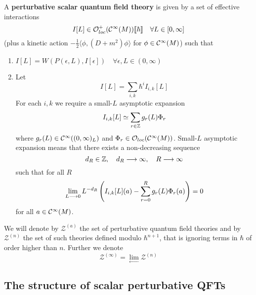 \begin{definition}
\label{def:PSQFTs}
  A \textbf{perturbative scalar quantum field theory} is given by a set of effective interactions
  \begin{equation}I[L] \in \mathcal{O}^+_{loc}(\mathcal{C}^{\infty}(M))\llbracket \hbar \rrbracket \quad \forall L \in [0, \infty]\end{equation}
  (plus a kinetic action $- \frac{1}{2} \langle \phi, (D + m^2) \phi \rangle$ for $\phi \in \Ci(M)$) such that
  \begin{enumerate}
    \item $I[L] = W(P(\epsilon, L), I[\epsilon]) \quad \forall \epsilon,L \in (0,\infty)$

    \item Let
    \begin{equation}I[L] = \sum_{i,k} \hbar^i I_{i,k}[L]\end{equation}
    For each $i,k$ we require a small-$L$ asymptotic expansion
    \begin{equation}I_{i,k}[L] \simeq \sum_{r \in \mathbb{Z}} g_r(L) \Phi_r\end{equation}
    where $g_r(L) \in \mathcal{C}^{\infty}((0,\infty)_L)$ and $\Phi_r \in \mathcal{O}_{loc}(\mathcal{C}^{\infty}(M))$. Small-$L$ asymptotic expansion means that there exists a non-decreasing sequence
    \begin{equation}d_R \in \mathbb{Z}, \quad d_R \longrightarrow \infty, \quad R\longrightarrow \infty\end{equation}
    such that for all $R$
    \begin{equation}\lim_{L \longrightarrow 0} L^{-d_R} \left( I_{i,k}[L](a) - \sum_{r=0}^R g_r(L) \Phi_r(a) \right) = 0\end{equation}
    for all $a \in \mathcal{C}^{\infty}(M)$.
  \end{enumerate}
  We will denote by $\mathcal{Z}^{(a)}$ the set of perturbative quantum field theories and by $\mathcal{Z}^{(n)}$ the set of such theories defined modulo $\hbar^{n+1}$, that is ignoring terms in $\hbar$ of order higher than $n$. Further we denote
  \begin{equation}\mathcal{Z}^{(\infty)} = \lim_{\longleftarrow} \mathcal{Z}^{(n)}\end{equation}
\end{definition}

\subsection{The structure of scalar perturbative QFTs}

